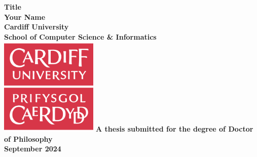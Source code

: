 \documentclass[a4paper,oneside,onecolumn,openright,12pt]{book} %
\begin{document}
\frontmatter

\begin{titlepage}

\begin{center}
\vspace*{3ex}
\textbf{\Huge Title}\\
\vfill
\textbf{\LARGE Your Name}\\[2ex]
\textbf{\large Cardiff University}\\
\textbf{\large School of Computer Science \& Informatics}\\
\vfill
\includegraphics[width=0.35\textwidth]{media/cardiff_uni_logo.png}
\vfill
\textbf{\large A thesis submitted for the degree of Doctor of Philosophy}\\[1ex]
\textbf{\large September 2024}\\
\end{center}

\end{titlepage}



\cleardoublepage



\cleardoublepage



\def\baselinestretch{1.5}\normalfont

\tableofcontents


\listoffigures
\listoftables
\listofalgorithms





\mainmatter



\backmatter

\def\baselinestretch{1}\normalfont
\def\baselinestretch{1.24}\normalfont


\end{document}
